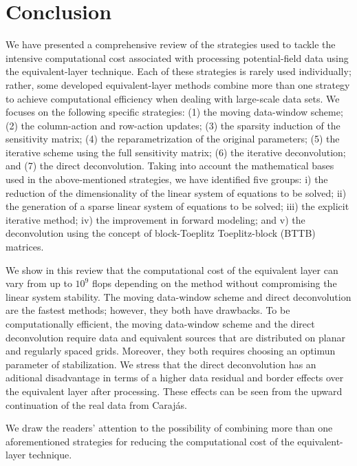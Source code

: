 \section{Conclusion}

We have presented a comprehensive review of the strategies used to tackle the intensive computational cost associated with processing potential-field data using the equivalent-layer technique. 
Each of these strategies is rarely used  individually; rather, some 
developed equivalent-layer methods combine more than one strategy to achieve computational efficiency when dealing with large-scale data sets.
We focuses on  the following specific strategies: 
(1) the moving data-window scheme;
(2) the column-action and row-action updates;
(3) the sparsity induction of the sensitivity matrix;
(4) the reparametrization of the original parameters;
(5) the iterative scheme using the full sensitivity matrix;
(6) the iterative deconvolution; and
(7) the direct deconvolution.
Taking into account the mathematical bases used in the above-mentioned strategies, we have identified five groups:
i) the reduction of the dimensionality of the linear system of equations to be solved;
ii) the generation of a sparse linear system of equations to be solved;
iii) the explicit iterative method;
iv) the improvement in forward modeling; and
v) the deconvolution using the concept of block-Toeplitz Toeplitz-block (BTTB) matrices.

We show in this review that the computational cost of the equivalent layer can vary from up to $10^{9}$ flops depending on the method without compromising the linear system stability. 
The moving data-window scheme and direct deconvolution are the fastest methods; however, they both have drawbacks.
To be computationally efficient, the moving data-window scheme and 
the direct deconvolution require data and equivalent sources that are distributed on planar and regularly spaced grids.
Moreover, they both requires choosing an optimun parameter of stabilization. 
We stress that the direct deconvolution has an aditional disadvantage in terms of a higher data residual and border effects over the equivalent layer after processing.
These effects can be seen from the upward continuation of the real data from Carajás.

We draw the readers' attention to the possibility of combining more than one aforementioned strategies for reducing the computational cost of the equivalent-layer technique.



